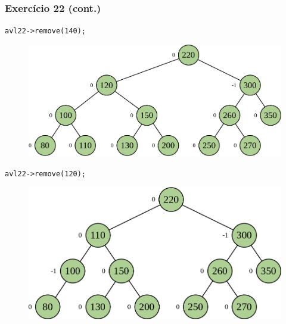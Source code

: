 \documentclass[aspectratio=169]{beamer}
\begin{document}
\begin{frame}[fragile]\frametitle{Exercício 22 (cont.)}
\texttt{avl22->remove(140);}
\begin{figure}[h]
	\centering
	\includegraphics[height=0.25\paperheight]{imagens/avl-exercicio22c.png}
\end{figure}
\texttt{avl22->remove(120);}
\begin{figure}[h]
	\centering
	\includegraphics[height=0.25\paperheight]{imagens/avl-exercicio22d.png}
\end{figure}
\end{frame}
\end{document}
